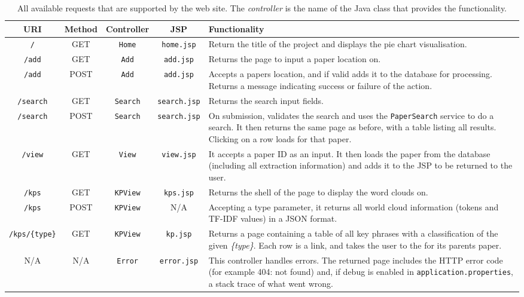 \begin{table}
	\centering
	\begin{tabular}{ c | c | c | c | C{6.5cm} }
		\textbf{URI} & \textbf{Method} & \textbf{Controller} & \textbf{JSP} & \textbf{Functionality} \\
		\hline
		\texttt{/} & GET & \texttt{Home} & \texttt{home.jsp} & Return the title of the project and displays the pie chart visualisation. \\
		\hline
		\texttt{/add} & GET & \texttt{Add} & \texttt{add.jsp} & Returns the page to input a paper location on. \\
		\hline
		\texttt{/add} & POST & \texttt{Add} & \texttt{add.jsp} & Accepts a papers location, and if valid adds it to the database for processing. Returns a message indicating success or failure of the action. \\
		\hline
		\texttt{/search} & GET & \texttt{Search} & \texttt{search.jsp} & Returns the search input fields. \\
		\hline
		\texttt{/search} & POST & \texttt{Search} & \texttt{search.jsp} & On submission, validates the search and uses the \texttt{PaperSearch} service to do a search. It then returns the same page as before, with a table listing all results. Clicking on a row loads  for that paper. \\
		\hline
		\texttt{/view} & GET & \texttt{View} & \texttt{view.jsp} & It accepts a paper ID as an input. It then loads the paper from the database (including all extraction information) and adds it to the JSP to be returned to the user. \\
		\hline
		\texttt{/kps} & GET & \texttt{KPView} & \texttt{kps.jsp} & Returns the shell of the page to display the word clouds on. \\
		\hline
		\texttt{/kps} & POST & \texttt{KPView} & N/A & Accepting a type parameter, it returns all world cloud information (tokens and TF-IDF values) in a JSON format. \\
		\hline
		\texttt{/kps/\{type\}} & GET & \texttt{KPView} & \texttt{kp.jsp} & Returns a page containing a table of all key phrases with a classification of the given \textit{\{type\}}. Each row is a link, and takes the user to the  for its parents paper. \\
		\hline
		N/A & N/A & \texttt{Error} & \texttt{error.jsp} & This controller handles errors. The returned page includes the HTTP error code (for example 404: not found) and, if debug is enabled in \texttt{application.properties}, a stack trace of what went wrong. \\
	\end{tabular}
	\caption[Available Requests the POC Website Supports]{All available requests that are supported by the web site. The \textit{controller} is the name of the Java class that provides the functionality.}
	\label{table:webservices}
\end{table}

